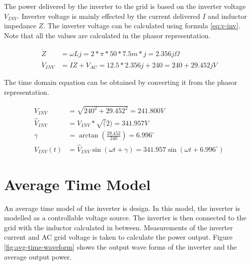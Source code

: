 \documentclass[12pt]{article}
\begin{document}
The power delivered by the inverter to the grid is based on the inverter voltage $V_{INV}$.
Inverter voltage is mainly effected by the current delivered $I$ and inductor impedance $Z$.
The inverter voltage can be calculated using formula \ref{eq:v-inv}.
Note that all the values are calculated in the phasor representation.

\begin{equation} \label{eq:v-inv}
    \begin{aligned}
        \dot{Z}       & = \omega{L}j = 2 * \pi * 50 * 7.5m * j = 2.356j \Omega                   \\
        \dot{V}_{INV} & = \dot{I} \dot{Z} + \dot{V}_{AC} = 12.5 * 2.356j + 240 = 240 + 29.452j V
    \end{aligned}
\end{equation}

The time domain equation can be obtained by converting it from the phasor representation.

\begin{equation}
    \begin{aligned}
        V_{INV}       & = \sqrt{240^2 + 29.452^2} = 241.800 V                                                  \\
        \hat{V}_{INV} & = V_{INV} * \sqrt(2) = 341.957 V                                                       \\
        \gamma        & = \arctan(\frac{29.452}{240}) = 6.996^{\circ{}}                                        \\
        V_{INV}(t)    & = \hat{V}_{INV} \sin(\omega{t} + \gamma{}) = 341.957 \sin(\omega{t} + 6.996^{\circ{}})
    \end{aligned}
\end{equation}

\section{Average Time Model}
\label{sec:avg-time-model}

An average time model of the inverter is design.
In this model, the inverter is modelled as a controllable voltage source.
The inverter is then connected to the grid with the inductor calculated in between.
Measurements of the inverter current and AC grid voltage is taken to calculate the power output.
Figure \ref{fig:avg-time-waveform} shows the output wave forms of the inverter and the average output power.
\end{document}
